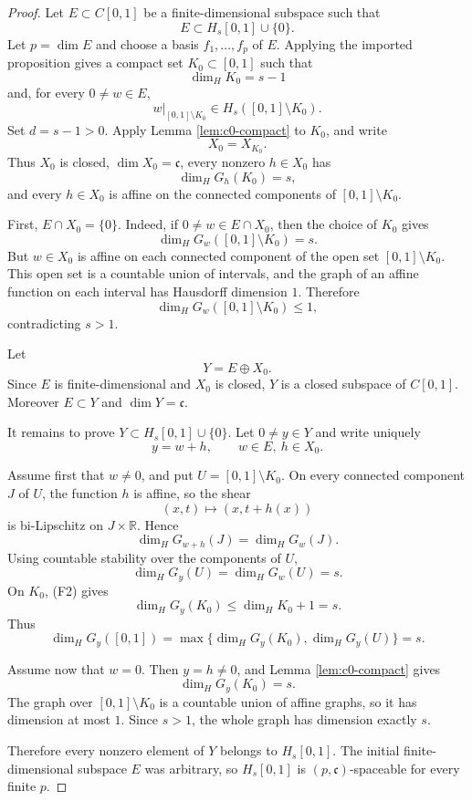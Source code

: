 \documentclass[11pt]{article}
\newcommand{\RR}{\mathbb R}
\newcommand{\cc}{\mathfrak c}
\newcommand{\dimH}{\dim_{\!H}}
\begin{document}
\begin{proof}
Let \(E\subset C[0,1]\) be a finite-dimensional subspace such that
\[
E\subset H_s[0,1]\cup\{0\}.
\]
Let \(p=\dim E\) and choose a basis \(f_1,\ldots,f_p\) of \(E\).  Applying the
imported proposition gives a compact set \(K_0\subset[0,1]\) such that
\[
\dimH K_0=s-1
\]
and, for every \(0\neq w\in E\),
\[
w|_{[0,1]\setminus K_0}\in H_s([0,1]\setminus K_0).
\]
Set \(d=s-1>0\).  Apply Lemma \ref{lem:c0-compact} to \(K_0\), and write
\[
X_0=X_{K_0}.
\]
Thus \(X_0\) is closed, \(\dim X_0=\cc\), every nonzero \(h\in X_0\) has
\[
\dimH G_h(K_0)=s,
\]
and every \(h\in X_0\) is affine on the connected components of
\([0,1]\setminus K_0\).

First, \(E\cap X_0=\{0\}\).  Indeed, if \(0\neq w\in E\cap X_0\), then the
choice of \(K_0\) gives
\[
\dimH G_w([0,1]\setminus K_0)=s.
\]
But \(w\in X_0\) is affine on each connected component of the open set
\([0,1]\setminus K_0\).  This open set is a countable union of intervals, and
the graph of an affine function on each interval has Hausdorff dimension \(1\).
Therefore
\[
\dimH G_w([0,1]\setminus K_0)\leq1,
\]
contradicting \(s>1\).

Let
\[
Y=E\oplus X_0.
\]
Since \(E\) is finite-dimensional and \(X_0\) is closed, \(Y\) is a closed
subspace of \(C[0,1]\).  Moreover \(E\subset Y\) and \(\dim Y=\cc\).

It remains to prove \(Y\subset H_s[0,1]\cup\{0\}\).  Let \(0\neq y\in Y\) and
write uniquely
\[
y=w+h,\qquad w\in E,\ h\in X_0.
\]

Assume first that \(w\neq0\), and put \(U=[0,1]\setminus K_0\).  On every
connected component \(J\) of \(U\), the function \(h\) is affine, so the shear
\[
(x,t)\mapsto (x,t+h(x))
\]
is bi-Lipschitz on \(J\times\RR\).  Hence
\[
\dimH G_{w+h}(J)=\dimH G_w(J).
\]
Using countable stability over the components of \(U\),
\[
\dimH G_y(U)=\dimH G_w(U)=s.
\]
On \(K_0\), (F2) gives
\[
\dimH G_y(K_0)\leq\dimH K_0+1=s.
\]
Thus
\[
\dimH G_y([0,1])=\max\{\dimH G_y(K_0),\dimH G_y(U)\}=s.
\]

Assume now that \(w=0\).  Then \(y=h\neq0\), and Lemma \ref{lem:c0-compact}
gives
\[
\dimH G_y(K_0)=s.
\]
The graph over \([0,1]\setminus K_0\) is a countable union of affine graphs, so
it has dimension at most \(1\).  Since \(s>1\), the whole graph has dimension
exactly \(s\).

Therefore every nonzero element of \(Y\) belongs to \(H_s[0,1]\).  The initial
finite-dimensional subspace \(E\) was arbitrary, so \(H_s[0,1]\) is
\((p,\cc)\)-spaceable for every finite \(p\).
\end{proof}
\end{document}
